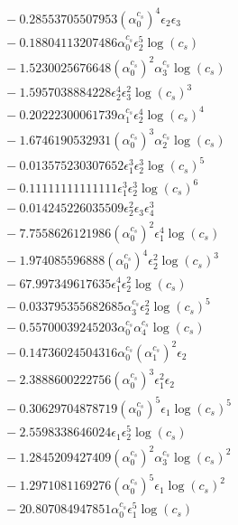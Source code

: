 \documentclass[10pt]{article}
\begin{document}
\begin{align*}
&{}  - 0.28553705507953 \left(\alpha_{0}^{c_s}\right)^{4} \epsilon_{2} \epsilon_{3} \\
&{}  - 0.18804113207486 \alpha_{0}^{c_s} \epsilon_{2}^{5} \log{\left(c_{s} \right)} \\
&{}  - 1.5230025676648 \left(\alpha_{0}^{c_s}\right)^{2} \alpha_{3}^{c_s} \log{\left(c_{s} \right)} \\
&{}  - 1.5957038884228 \epsilon_{2}^{4} \epsilon_{3}^{2} \log{\left(c_{s} \right)}^{3} \\
&{}  - 0.20222300061739 \alpha_{1}^{c_s} \epsilon_{2}^{4} \log{\left(c_{s} \right)}^{4} \\
&{}  - 1.6746190532931 \left(\alpha_{0}^{c_s}\right)^{3} \alpha_{2}^{c_s} \log{\left(c_{s} \right)} \\
&{}  - 0.013575230307652 \epsilon_{1}^{3} \epsilon_{2}^{3} \log{\left(c_{s} \right)}^{5} \\
&{}  - 0.11111111111111 \epsilon_{1}^{3} \epsilon_{2}^{3} \log{\left(c_{s} \right)}^{6} \\
&{}  - 0.014245226035509 \epsilon_{2}^{2} \epsilon_{3} \epsilon_{4}^{3} \\
&{}  - 7.7558626121986 \left(\alpha_{0}^{c_s}\right)^{2} \epsilon_{1}^{4} \log{\left(c_{s} \right)} \\
&{}  - 1.974085596888 \left(\alpha_{0}^{c_s}\right)^{4} \epsilon_{2}^{2} \log{\left(c_{s} \right)}^{3} \\
&{}  - 67.997349617635 \epsilon_{1}^{4} \epsilon_{2}^{2} \log{\left(c_{s} \right)} \\
&{}  - 0.033795355682685 \alpha_{3}^{c_s} \epsilon_{2}^{2} \log{\left(c_{s} \right)}^{5} \\
&{}  - 0.55700039245203 \alpha_{0}^{c_s} \alpha_{4}^{c_s} \log{\left(c_{s} \right)} \\
&{}  - 0.14736024504316 \alpha_{0}^{c_s} \left(\alpha_{1}^{c_s}\right)^{2} \epsilon_{2} \\
&{}  - 2.3888600222756 \left(\alpha_{0}^{c_s}\right)^{3} \epsilon_{1}^{2} \epsilon_{2} \\
&{}  - 0.30629704878719 \left(\alpha_{0}^{c_s}\right)^{5} \epsilon_{1} \log{\left(c_{s} \right)}^{5} \\
&{}  - 2.5598338646024 \epsilon_{1} \epsilon_{2}^{5} \log{\left(c_{s} \right)} \\
&{}  - 1.2845209427409 \left(\alpha_{0}^{c_s}\right)^{2} \alpha_{3}^{c_s} \log{\left(c_{s} \right)}^{2} \\
&{}  - 1.2971081169276 \left(\alpha_{0}^{c_s}\right)^{5} \epsilon_{1} \log{\left(c_{s} \right)}^{2} \\
&{}  - 20.807084947851 \alpha_{0}^{c_s} \epsilon_{1}^{5} \log{\left(c_{s} \right)}
\end{align*}
\end{document}
